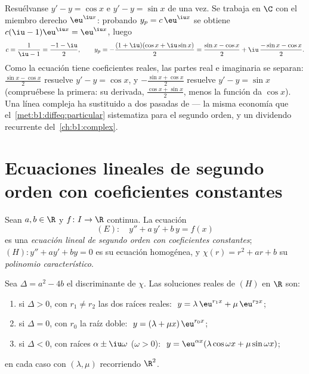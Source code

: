 \begin{example}\label{ex:b1:diffeq:complexrhs}
Resuélvanse $y' - y = \cos x$ e $y' - y = \sin x$ de una vez. Se
trabaja en $\C$ con el miembro derecho $\eu^{\iu x}$: probando
$y_p = c\,\eu^{\iu x}$ se obtiene $c(\iu - 1)\eu^{\iu x} = \eu^{\iu x}$, luego
\[
c = \frac1{\iu - 1} = \frac{-1 - \iu}2,
\qquad
y_p = -\frac{(1 + \iu)(\cos x + \iu\sin x)}2
= \frac{\sin x - \cos x}2 + \iu\,\frac{-\sin x - \cos x}2 .
\]
Como la ecuación tiene coeficientes reales, las partes real e
imaginaria se separan: $\frac{\sin x - \cos x}2$ resuelve
$y' - y = \cos x$, y $-\frac{\sin x + \cos x}2$ resuelve
$y' - y = \sin x$ (compruébese la primera: su derivada,
$\frac{\cos x + \sin x}2$, menos la función da $\cos x$). Una línea
compleja ha sustituido a dos pasadas de 
--- la misma economía que el~\cref{met:b1:diffeq:particular}
sistematiza para el segundo orden, y un dividendo recurrente
del~\cref{ch:b1:complex}.
\end{example}

\section{Ecuaciones lineales de segundo orden con coeficientes constantes}

\begin{definition}\label{def:b1:diffeq:linear2}
Sean $a, b \in \R$ y $f \colon I \to \R$ continua. La ecuación
\[
(E)\colon\quad y'' + a\,y' + b\,y = f(x)
\]
es una \emph{ecuación lineal de segundo orden con coeficientes
constantes};
$(H)\colon y'' + ay' + by = 0$ es su ecuación homogénea, y
$\chi(r) = r^2 + ar + b$ su \emph{polinomio
característico}.
\end{definition}

\begin{theorem}\label{thm:b1:diffeq:homogeneous2}
Sea $\Delta = a^2 - 4b$ el discriminante de $\chi$. Las soluciones
reales de $(H)$ en $\R$ son:
\begin{enumerate}
  \item si $\Delta > 0$, con $r_1 \neq r_2$ las dos raíces reales:
        $\;y = \lambda\, \eu^{r_1 x} + \mu\, \eu^{r_2 x}$;
  \item si $\Delta = 0$, con $r_0$ la raíz doble:
        $\;y = (\lambda + \mu x)\, \eu^{r_0 x}$;
  \item si $\Delta < 0$, con raíces $\alpha \pm \iu\omega$
        ($\omega > 0$):
        $\;y = \eu^{\alpha x} (\lambda \cos\omega x + \mu
        \sin\omega x)$;
\end{enumerate}
en cada caso con $(\lambda, \mu)$ recorriendo $\R^2$.
\end{theorem}

